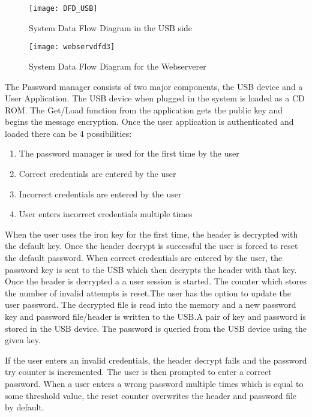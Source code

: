 \begin{figure*}
    \centering
    \texttt{[image: DFD\_USB]}
    \caption{System Data Flow Diagram in the USB side}
    \label{fig:dfd_usb}
\end{figure*}



\begin{figure*}
    \centering
    \texttt{[image: webservdfd3]}
    \caption{System Data Flow Diagram for the Webserverer}
    \label{fig:wsdfd}
\end{figure*}

The Password manager consists of two major components, the USB device and a User
Application. The USB device when plugged in the system is loaded as a CD
ROM. The Get/Load function from the application gets the public key and begins
the message
encryption. Once the user application is authenticated and loaded there can be 4
possibilities:
\begin{enumerate}
\item The password manager is used for the first time by the user
\item Correct credentials are entered by the user
\item Incorrect credentials are entered by the user
\item User enters incorrect credentials multiple times
\end{enumerate}

When the user uses the iron key for the first time, the header is decrypted with
the default key. Once the header decrypt is successful the user is forced to
reset the default password. When correct credentials are entered by the user,
the password key is sent to the USB which then decrypts the header with that
key.  Once the header is decrypted a a user session is started. The counter
which stores the number of invalid attempts is reset.The user has the option to
update the user password. The decrypted file is read into the memory and a new
password key and password file/header is written to the USB.A pair of key and
password is stored in the USB device. The password is queried from the USB
device using the given key.

If the user enters an invalid credentials, the header decrypt fails and the
password try counter is incremented. The user is
then prompted to enter a correct password. When a user enters a wrong password
multiple times which is equal to some threshold value, the reset counter
overwrites the header and password file by default.

